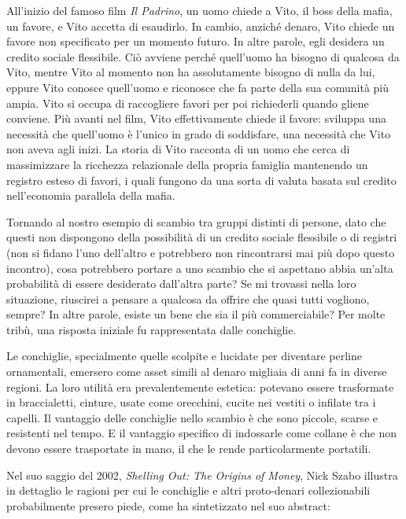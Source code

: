 \documentclass[
  a5paper,
  smalldemyvopaper,10pt,twoside,onecolumn,openright,extrafontsizes,hidelinks]{memoir}
\begin{document}
All'inizio del famoso film \emph{Il Padrino}, un uomo chiede a Vito, il
boss della mafia, un favore, e Vito accetta di esaudirlo. In cambio,
anziché denaro, Vito chiede un favore non specificato per un momento
futuro. In altre parole, egli desidera un credito sociale flessibile.
Ciò avviene perché quell'uomo ha bisogno di qualcosa da Vito, mentre
Vito al momento non ha assolutamente bisogno di nulla da lui, eppure
Vito conosce quell'uomo e riconosce che fa parte della sua comunità più
ampia. Vito si occupa di raccogliere favori per poi richiederli quando
gliene conviene. Più avanti nel film, Vito effettivamente chiede il
favore: sviluppa una necessità che quell'uomo è l'unico in grado di
soddisfare, una necessità che Vito non aveva agli inizi. La storia di
Vito racconta di un uomo che cerca di massimizzare la ricchezza
relazionale della propria famiglia mantenendo un registro esteso di
favori, i quali fungono da una sorta di valuta basata sul credito
nell'economia parallela della mafia.

Tornando al nostro esempio di scambio tra gruppi distinti di persone,
dato che questi non dispongono della possibilità di un credito sociale
flessibile o di registri (non si fidano l'uno dell'altro e potrebbero
non rincontrarsi mai più dopo questo incontro), cosa potrebbero portare
a uno scambio che si aspettano abbia un'alta probabilità di essere
desiderato dall'altra parte? Se mi trovassi nella loro situazione,
riuscirei a pensare a qualcosa da offrire che quasi tutti vogliono,
sempre? In altre parole, esiste un bene che sia il più commerciabile?
Per molte tribù, una risposta iniziale fu rappresentata dalle
conchiglie.

Le conchiglie, specialmente quelle scolpite e lucidate per diventare
perline ornamentali, emersero come asset simili al denaro migliaia di
anni fa in diverse regioni. La loro utilità era prevalentemente
estetica: potevano essere trasformate in braccialetti, cinture, usate
come orecchini, cucite nei vestiti o infilate tra i capelli. Il
vantaggio delle conchiglie nello scambio è che sono piccole, scarse e
resistenti nel tempo. E il vantaggio specifico di indossarle come
collane è che non devono essere trasportate in mano, il che le rende
particolarmente portatili.

Nel suo saggio del 2002, \emph{Shelling Out: The Origins of Money}, Nick
Szabo illustra in dettaglio le ragioni per cui le conchiglie e altri
proto-denari collezionabili probabilmente presero piede, come ha
sintetizzato nel suo abstract:
\end{document}

